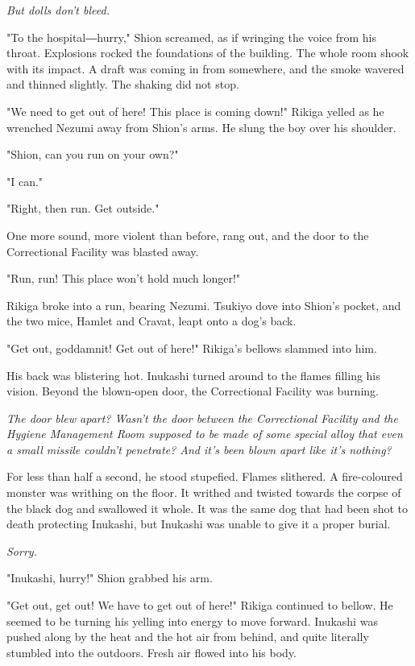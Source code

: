 \emph{But dolls don't bleed.}

"To the hospital―hurry," Shion screamed, as if wringing the voice from
his throat. Explosions rocked the foundations of the building. The whole
room shook with its impact. A draft was coming in from somewhere, and
the smoke wavered and thinned slightly. The shaking did not stop.

"We need to get out of here! This place is coming down!" Rikiga yelled
as he wrenched Nezumi away from Shion's arms. He slung the boy over his
shoulder.

"Shion, can you run on your own?"

"I can."

"Right, then run. Get outside."

One more sound, more violent than before, rang out, and the door to the
Correctional Facility was blasted away.

"Run, run! This place won't hold much longer!"

Rikiga broke into a run, bearing Nezumi. Tsukiyo dove into Shion's
pocket, and the two mice, Hamlet and Cravat, leapt onto a dog's back.

"Get out, goddamnit! Get out of here!" Rikiga's bellows slammed into
him.

His back was blistering hot. Inukashi turned around to the flames
filling his vision. Beyond the blown-open door, the Correctional
Facility was burning.

\emph{The door blew apart? Wasn't the door between the Correctional Facility
and the Hygiene Management Room supposed to be made of some special
alloy that even a small missile couldn't penetrate? And it's been blown
apart like it's nothing?}

For less than half a second, he stood stupefied. Flames slithered. A
fire-coloured monster was writhing on the floor. It writhed and twisted
towards the corpse of the black dog and swallowed it whole. It was the
same dog that had been shot to death protecting Inukashi, but Inukashi
was unable to give it a proper burial.

\emph{Sorry.}

"Inukashi, hurry!" Shion grabbed his arm.

"Get out, get out! We have to get out of here!" Rikiga continued to
bellow. He seemed to be turning his yelling into energy to move forward.
Inukashi was pushed along by the heat and the hot air from behind, and
quite literally stumbled into the outdoors. Fresh air flowed into his
body.

